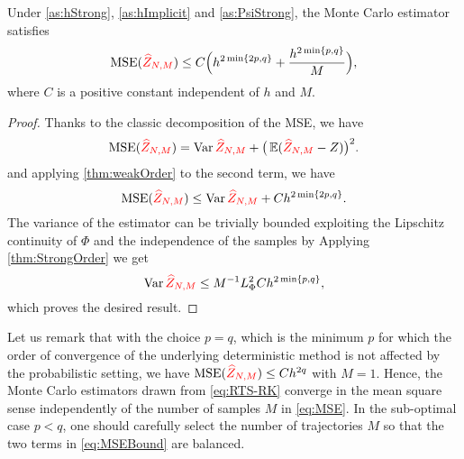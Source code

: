\documentclass[10pt]{article}
\begin{document}
\begin{theorem}\label{thm:MSEMonteCarlo} Under \cref{as:hStrong}, \cref{as:hImplicit} and \cref{as:PsiStrong}, the Monte Carlo estimator  satisfies
	\begin{equation}\label{eq:MSEBound}
		\operatorname{MSE}({\color{red}\widehat Z_{N, M}}) \leq C\Big(h^{2\min\{2p, q\}} + \frac{h^{2\min\{p, q\}}}{M}\Big),
	\end{equation}
	where $C$ is a positive constant independent of $h$ and $M$.
\end{theorem}
\begin{proof} Thanks to the classic decomposition of the MSE, we have
	\begin{equation}\label{eq:MSEDecomposition}
		\operatorname{MSE}({\color{red}\widehat Z_{N, M}}) = \operatorname{Var} {\color{red}\widehat Z_{N, M}}  + \big(\operatorname{\mathbb{E}}({\color{red}\widehat Z_{N, M}} - Z)\big)^2.
	\end{equation}
	 and applying \cref{thm:weakOrder} to the second term, we have
	\begin{equation}\label{eq:MSEWeakOrder}
		\operatorname{MSE}({\color{red}\widehat Z_{N, M}}) \leq \operatorname{Var} {\color{red}\widehat Z_{N, M}}  + Ch^{2\min\{2p, q\}}.
	\end{equation}
	The variance of the estimator can be trivially bounded exploiting the Lipschitz continuity of $\Phi$ and the independence of the samples by
	Applying \cref{thm:StrongOrder} we get
	\begin{equation}
		\operatorname{Var}{\color{red}\widehat Z_{N, M}} \leq M^{-1} L_\Phi^2 Ch^{2\min\{p, q\}},
	\end{equation}
	which proves the desired result.
\end{proof}
Let us remark that with the choice $p = q$, which is the minimum $p$ for which the order of convergence of the underlying deterministic method is not affected by the probabilistic setting, we have $\operatorname{MSE}({\color{red}\widehat Z_{N, M}}) \leq Ch^{2q}$ with $M = 1$. Hence, the Monte Carlo estimators drawn from \eqref{eq:RTS-RK} converge in the mean square sense independently of the number of samples $M$ in \eqref{eq:MSE}. In the sub-optimal case $p < q$, one should carefully select the number of trajectories $M$ so that the two terms in \eqref{eq:MSEBound} are balanced. 
\end{document}
